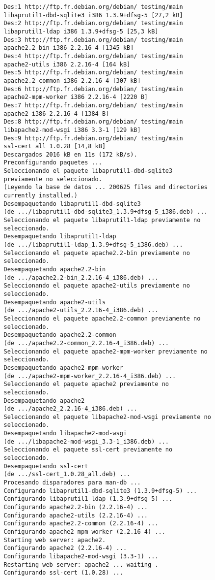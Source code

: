    \begin{verbatim}
   Des:1 http://ftp.fr.debian.org/debian/ testing/main
   libaprutil1-dbd-sqlite3 i386 1.3.9+dfsg-5 [27,2 kB]
   Des:2 http://ftp.fr.debian.org/debian/ testing/main
   libaprutil1-ldap i386 1.3.9+dfsg-5 [25,3 kB]
   Des:3 http://ftp.fr.debian.org/debian/ testing/main
   apache2.2-bin i386 2.2.16-4 [1345 kB]
   Des:4 http://ftp.fr.debian.org/debian/ testing/main
   apache2-utils i386 2.2.16-4 [164 kB]
   Des:5 http://ftp.fr.debian.org/debian/ testing/main
   apache2.2-common i386 2.2.16-4 [307 kB]
   Des:6 http://ftp.fr.debian.org/debian/ testing/main
   apache2-mpm-worker i386 2.2.16-4 [2220 B]
   Des:7 http://ftp.fr.debian.org/debian/ testing/main
   apache2 i386 2.2.16-4 [1384 B]
   Des:8 http://ftp.fr.debian.org/debian/ testing/main
   libapache2-mod-wsgi i386 3.3-1 [129 kB]
   Des:9 http://ftp.fr.debian.org/debian/ testing/main
   ssl-cert all 1.0.28 [14,8 kB]
   Descargados 2016 kB en 11s (172 kB/s).
   Preconfigurando paquetes ...
   Seleccionando el paquete libaprutil1-dbd-sqlite3
   previamente no seleccionado.
   (Leyendo la base de datos ... 200625 files and directories
   currently installed.)
   Desempaquetando libaprutil1-dbd-sqlite3
   (de .../libaprutil1-dbd-sqlite3_1.3.9+dfsg-5_i386.deb) ...
   Seleccionando el paquete libaprutil1-ldap previamente no
   seleccionado.
   Desempaquetando libaprutil1-ldap
   (de .../libaprutil1-ldap_1.3.9+dfsg-5_i386.deb) ...
   Seleccionando el paquete apache2.2-bin previamente no
   seleccionado.
   Desempaquetando apache2.2-bin
   (de .../apache2.2-bin_2.2.16-4_i386.deb) ...
   Seleccionando el paquete apache2-utils previamente no
   seleccionado.
   Desempaquetando apache2-utils
   (de .../apache2-utils_2.2.16-4_i386.deb) ...
   Seleccionando el paquete apache2.2-common previamente no
   seleccionado.
   Desempaquetando apache2.2-common
   (de .../apache2.2-common_2.2.16-4_i386.deb) ...
   Seleccionando el paquete apache2-mpm-worker previamente no
   seleccionado.
   Desempaquetando apache2-mpm-worker
   (de .../apache2-mpm-worker_2.2.16-4_i386.deb) ...
   Seleccionando el paquete apache2 previamente no
   seleccionado.
   Desempaquetando apache2
   (de .../apache2_2.2.16-4_i386.deb) ...
   Seleccionando el paquete libapache2-mod-wsgi previamente no
   seleccionado.
   Desempaquetando libapache2-mod-wsgi
   (de .../libapache2-mod-wsgi_3.3-1_i386.deb) ...
   Seleccionando el paquete ssl-cert previamente no
   seleccionado.
   Desempaquetando ssl-cert
   (de .../ssl-cert_1.0.28_all.deb) ...
   Procesando disparadores para man-db ...
   Configurando libaprutil1-dbd-sqlite3 (1.3.9+dfsg-5) ...
   Configurando libaprutil1-ldap (1.3.9+dfsg-5) ...
   Configurando apache2.2-bin (2.2.16-4) ...
   Configurando apache2-utils (2.2.16-4) ...
   Configurando apache2.2-common (2.2.16-4) ...
   Configurando apache2-mpm-worker (2.2.16-4) ...
   Starting web server: apache2.
   Configurando apache2 (2.2.16-4) ...
   Configurando libapache2-mod-wsgi (3.3-1) ...
   Restarting web server: apache2 ... waiting .
   Configurando ssl-cert (1.0.28) ...
   \end{verbatim}

